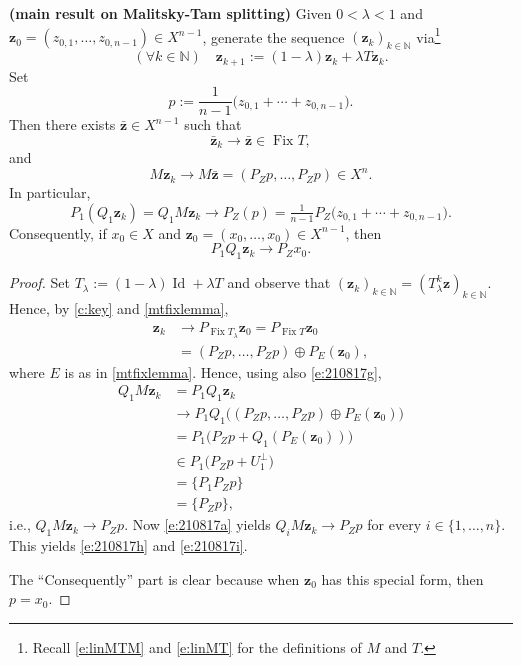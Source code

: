 \documentclass[10pt,a4paper]{amsart}
\newcommand{\Fix}{\ensuremath{\operatorname{Fix}}}
\newcommand{\Id}{\ensuremath{\operatorname{Id}}}
\newcommand{\bz}{\ensuremath{\mathbf{z}}}
\newcommand{\kkk}{\ensuremath{{k\in{\mathbb N}}}}
\begin{document}
\begin{theorem} {\bf (main result on Malitsky-Tam splitting)} 
Given $0<\lambda<1$ and $\bz_0=(z_{0,1},\ldots,z_{0,n-1}) \in X^{n-1}$, 
generate the sequence $(\bz_k)_\kkk$ via\footnote{Recall \cref{e:linMTM} 
and \cref{e:linMT} for the definitions of $M$ and $T$.}
\begin{equation*}
(\forall\kkk)\quad
\bz_{k+1} := (1-\lambda)\bz_k + \lambda T\bz_k.
\end{equation*}
Set 
\begin{equation*}
p := \frac{1}{n-1}\big(z_{0,1}+\cdots+z_{0,n-1}\big). 
\end{equation*}
Then there exists $\bar{\bz}\in X^{n-1}$ such that 
\begin{equation*}
\bar{\bz}_k \to \bar{\bz} \in \Fix T,
\end{equation*}
and 
\begin{equation}
\label{e:210817h}
M\bz_k \to M\bar{\bz} = (P_Zp,\ldots,P_Zp) \in X^n. 
\end{equation}
In particular, 
\begin{equation}
\label{e:210817i}
P_1(Q_1\bz_k)= Q_1M\bz_k \to P_Z(p) = \tfrac{1}{n-1}P_Z\big(z_{0,1}+\cdots+z_{0,n-1}\big).
\end{equation}
Consequently, if $x_0\in X$ and 
$\bz_0 = (x_0,\ldots,x_0)\in X^{n-1}$,
then 
\begin{equation}
\label{e:yayyay}
P_1Q_1\bz_k \to P_Zx_0.
\end{equation}
\end{theorem}

\begin{proof}
Set $T_\lambda := (1-\lambda)\Id+\lambda T$ and observe that 
$(\bz_k)_\kkk = (T_\lambda^k\bz)_\kkk$. 
Hence, by \cref{c:key} and \cref{mtfixlemma},
\begin{align*}
\bz_k&\to P_{\Fix T_\lambda}\bz_0=P_{\Fix T}\bz_0\\
&=(P_Zp,\ldots,P_Zp)\oplus P_E(\bz_0), 
\end{align*}
where $E$ is as in \cref{mtfixlemma}. 
Hence, using also \cref{e:210817g}, 
\begin{align*}
Q_1M\bz_k &= P_1Q_1\bz_k \\
&\to P_1Q_1\big((P_Zp,\ldots,P_Zp)\oplus P_E(\bz_0)\big)\\
&=P_1\big(P_Zp+Q_1(P_E(\bz_0))\big)\\
&\in P_1\big(P_Zp+U_1^\perp\big)\\
&=\{P_1P_Zp\}\\
&=\{P_Zp\},
\end{align*}
i.e., $Q_1M\bz_k\to P_Zp$. 
Now \cref{e:210817a} yields 
$Q_iM\bz_k\to P_Zp$ for every $i\in\{1,\ldots,n\}$.
This yields \cref{e:210817h} and \cref{e:210817i}.

The ``Consequently'' part is clear because when 
$\bz_0$ has this special form, then $p=x_0$. 
\end{proof}
\end{document}
